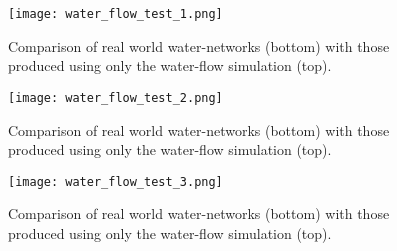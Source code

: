 \begin{figure}
\center
	\texttt{[image: water\_flow\_test\_1.png]}
	\caption{ Comparison of real world water-networks (bottom) with those produced using only the water-flow simulation (top).}
	\label{fig:water_flow_test_1}
\end{figure}

\begin{figure}
\center
	\texttt{[image: water\_flow\_test\_2.png]}
	\caption{ Comparison of real world water-networks (bottom) with those produced using only the water-flow simulation (top).}
	\label{fig:water_flow_test_2}
\end{figure}

\begin{figure}
\center
	\texttt{[image: water\_flow\_test\_3.png]}
	\caption{ Comparison of real world water-networks (bottom) with those produced using only the water-flow simulation (top).}
	\label{fig:water_flow_test_3}
\end{figure}